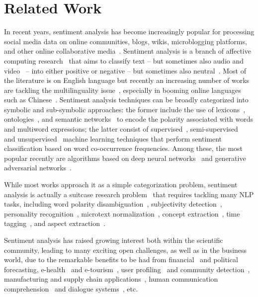 \documentclass[review]{elsarticle}
\newcommand\?[1]{\hl{#1}}
\begin{document}
\section{Related Work}
\label{sec:related-work-1}
In recent years, sentiment analysis has become increasingly popular for processing social media data on online communities, blogs, wikis, microblogging platforms, and other online collaborative media~\citep{camacsa}. Sentiment analysis is a branch of affective computing research~\citep{porrev} that aims to classify text -- but sometimes also audio and video~\citep{hazcon} -- into either positive or negative -- but sometimes also neutral~\citep{chadis}. Most of the literature is on English language but recently an increasing number of works are tackling the multilinguality issue~\citep{loomul,dashtipour2016multilingual}, especially in booming online languages such as Chinese~\citep{penlea}.
Sentiment analysis techniques can be broadly categorized into symbolic and sub-symbolic approaches: the former include the use of lexicons~\citep{banlex}, ontologies~\citep{draont}, and semantic networks~\citep{camnt5} to encode the polarity associated with words and multiword expressions; the latter consist of supervised~\citep{onesta}, semi-supervised~\citep{hussem} and unsupervised~\citep{liilea} machine learning techniques that perform sentiment classification based on word co-occurrence frequencies. Among these, the most popular recently are algorithms based on deep neural networks~\citep{yourec} and generative adversarial networks~\citep{liigen}.

While most works approach it as a simple categorization problem, sentiment analysis is actually a suitcase research problem~\citep{camsui} that requires tackling many NLP tasks, including word polarity disambiguation~\citep{xiawor}, subjectivity detection~\citep{chasub}, personality recognition~\citep{majdee}, microtext normalization~\citep{satpho}, concept extraction~\citep{dhegra}, time tagging~\citep{zhotem}, and aspect extraction~\citep{maatar}.

Sentiment analysis has raised growing interest both within the scientific community, leading to many exciting open challenges, as well as in the business world, due to the remarkable benefits to be had from financial~\citep{xinfin} and political~\citep{ebrcha} forecasting, e-health~\citep{campat} and e-tourism~\citep{valsen}, user profiling~\citep{mihwha} and community detection~\citep{cavlea}, manufacturing and supply chain applications~\citep{xuuada}, human communication comprehension~\citep{zadatt} and dialogue systems~\citep{youaug}, etc.
\end{document}
